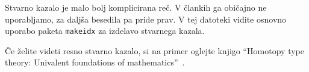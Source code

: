 \documentclass{article}
\begin{document}
Stvarno kazalo%
%
je malo bolj komplicirana reč. V člankih ga običajno ne uporabljamo, za daljša besedila pa
pride prav. V tej datoteki vidite osnovno uporabo paketa \texttt{makeidx} za izdelavo
stvarnega kazala.
%

Če želite videti resno stvarno kazalo, si na primer oglejte knjigo ``Homotopy type theory:
Univalent foundations of mathematics''~\cite{hottbook}.









\printindex
\end{document}
